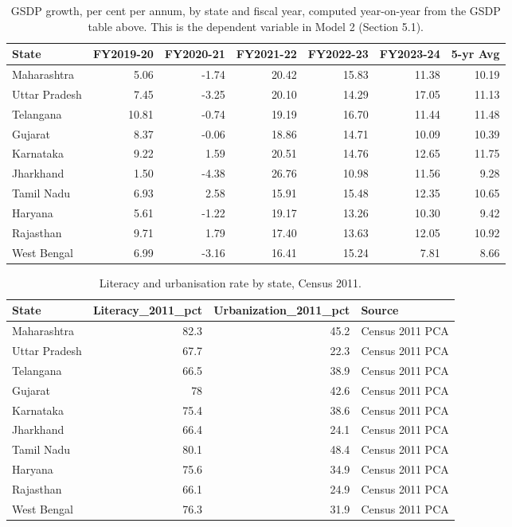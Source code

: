 \documentclass[12pt,a4paper]{article}
\begin{document}
\begin{table}[H]
\centering
\caption{GSDP growth, per cent per annum, by state and fiscal year, computed year-on-year from the GSDP table above. This is the dependent variable in Model 2 (Section 5.1).}
\label{tab:13}
\footnotesize
\begin{adjustbox}{max width=\textwidth}
\begin{tabular}{@{}lrrrrrr@{}}
\toprule
State & FY2019-20 & FY2020-21 & FY2021-22 & FY2022-23 & FY2023-24 & 5-yr Avg \\
\midrule
Maharashtra & 5.06 & -1.74 & 20.42 & 15.83 & 11.38 & 10.19 \\
Uttar Pradesh & 7.45 & -3.25 & 20.10 & 14.29 & 17.05 & 11.13 \\
Telangana & 10.81 & -0.74 & 19.19 & 16.70 & 11.44 & 11.48 \\
Gujarat & 8.37 & -0.06 & 18.86 & 14.71 & 10.09 & 10.39 \\
Karnataka & 9.22 & 1.59 & 20.51 & 14.76 & 12.65 & 11.75 \\
Jharkhand & 1.50 & -4.38 & 26.76 & 10.98 & 11.56 & 9.28 \\
Tamil Nadu & 6.93 & 2.58 & 15.91 & 15.48 & 12.35 & 10.65 \\
Haryana & 5.61 & -1.22 & 19.17 & 13.26 & 10.30 & 9.42 \\
Rajasthan & 9.71 & 1.79 & 17.40 & 13.63 & 12.05 & 10.92 \\
West Bengal & 6.99 & -3.16 & 16.41 & 15.24 & 7.81 & 8.66 \\
\bottomrule
\end{tabular}
\end{adjustbox}
\end{table}

\begin{table}[H]
\centering
\caption{Literacy and urbanisation rate by state, Census 2011.}
\label{tab:14}
\footnotesize
\begin{adjustbox}{max width=\textwidth}
\begin{tabular}{@{}lrrl@{}}
\toprule
State & Literacy\_2011\_pct & Urbanization\_2011\_pct & Source \\
\midrule
Maharashtra & 82.3 & 45.2 & Census 2011 PCA \\
Uttar Pradesh & 67.7 & 22.3 & Census 2011 PCA \\
Telangana & 66.5 & 38.9 & Census 2011 PCA \\
Gujarat & 78 & 42.6 & Census 2011 PCA \\
Karnataka & 75.4 & 38.6 & Census 2011 PCA \\
Jharkhand & 66.4 & 24.1 & Census 2011 PCA \\
Tamil Nadu & 80.1 & 48.4 & Census 2011 PCA \\
Haryana & 75.6 & 34.9 & Census 2011 PCA \\
Rajasthan & 66.1 & 24.9 & Census 2011 PCA \\
West Bengal & 76.3 & 31.9 & Census 2011 PCA \\
\bottomrule
\end{tabular}
\end{adjustbox}
\end{table}
\end{document}
